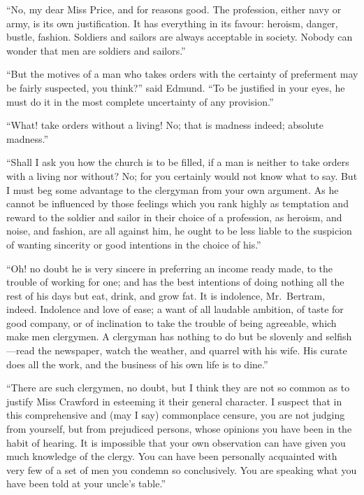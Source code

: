 ``No, my dear Miss Price, and for reasons good.  The profession,
either navy or army, is its own justification.  It has
everything in its favour:  heroism, danger, bustle, fashion.
Soldiers and sailors are always acceptable in society.
Nobody can wonder that men are soldiers and sailors.''

``But the motives of a man who takes orders with the certainty
of preferment may be fairly suspected, you think?''
said Edmund.  ``To be justified in your eyes, he must
do it in the most complete uncertainty of any provision.''

``What! take orders without a living!  No; that is
madness indeed; absolute madness.''

``Shall I ask you how the church is to be filled, if a man
is neither to take orders with a living nor without?
No; for you certainly would not know what to say.
But I must beg some advantage to the clergyman from
your own argument.  As he cannot be influenced by those
feelings which you rank highly as temptation and reward
to the soldier and sailor in their choice of a profession,
as heroism, and noise, and fashion, are all against him,
he ought to be less liable to the suspicion of wanting
sincerity or good intentions in the choice of his.''

``Oh! no doubt he is very sincere in preferring an income
ready made, to the trouble of working for one; and has
the best intentions of doing nothing all the rest of his
days but eat, drink, and grow fat.  It is indolence,
Mr.\ Bertram, indeed.  Indolence and love of ease; a want
of all laudable ambition, of taste for good company,
or of inclination to take the trouble of being agreeable,
which make men clergymen.  A clergyman has nothing
to do but be slovenly and selfish---read the newspaper,
watch the weather, and quarrel with his wife.  His curate
does all the work, and the business of his own life is
to dine.''

``There are such clergymen, no doubt, but I think they
are not so common as to justify Miss Crawford in esteeming
it their general character.  I suspect that in this
comprehensive and (may I say) commonplace censure, you are
not judging from yourself, but from prejudiced persons,
whose opinions you have been in the habit of hearing.
It is impossible that your own observation can have given
you much knowledge of the clergy.  You can have been
personally acquainted with very few of a set of men you
condemn so conclusively.  You are speaking what you have
been told at your uncle's table.''

